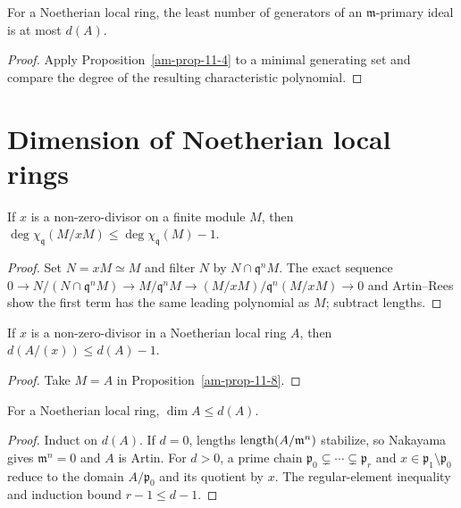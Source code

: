 \begin{proposition}
\label{am-prop-11-7}
\uses{}
For a Noetherian local ring, the least number of generators of an
$\mathfrak{m}$-primary ideal is at most $d(A)$.
\end{proposition}
\begin{proof}
Apply Proposition~\ref{am-prop-11-4} to a minimal generating set and compare
the degree of the resulting characteristic polynomial.
\end{proof}

\section{Dimension of Noetherian local rings}
\label{am-ch11-local-dimension}
\begin{proposition}
\label{am-prop-11-8}
\uses{}
If $x$ is a non-zero-divisor on a finite module $M$, then
$\deg\chi_{\mathfrak{q}}(M/xM)\le\deg\chi_{\mathfrak{q}}(M)-1$.
\end{proposition}
\begin{proof}
Set $N=xM\simeq M$ and filter $N$ by $N\cap\mathfrak{q}^nM$.  The exact sequence
$0\to N/(N\cap\mathfrak{q}^nM)\to M/\mathfrak{q}^nM\to(M/xM)/\mathfrak{q}^n(M/xM)\to0$ and
Artin--Rees show the first term has the same leading polynomial as $M$;
subtract lengths.
\end{proof}
\begin{corollary}
\label{am-cor-11-9}
\uses{}
If $x$ is a non-zero-divisor in a Noetherian local ring $A$, then
$d(A/(x))\le d(A)-1$.
\end{corollary}
\begin{proof}
Take $M=A$ in Proposition~\ref{am-prop-11-8}.
\end{proof}
\begin{proposition}
\label{am-prop-11-10}
\uses{}
For a Noetherian local ring, $\dim A\le d(A)$.
\end{proposition}
\begin{proof}
Induct on $d(A)$.  If $d=0$, lengths $\operatorname{length}(A/\mathfrak{m}^n)$ stabilize, so
Nakayama gives $\mathfrak{m}^n=0$ and $A$ is Artin.  For $d>0$, a prime chain
$\mathfrak{p}_0\subsetneq\cdots\subsetneq\mathfrak{p}_r$ and $x\in\mathfrak{p}_1\setminus\mathfrak{p}_0$ reduce to
the domain $A/\mathfrak{p}_0$ and its quotient by $x$.  The regular-element inequality
and induction bound $r-1\le d-1$.
\end{proof}

